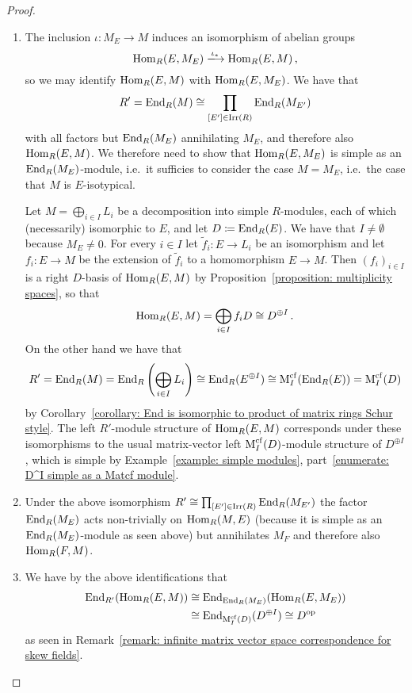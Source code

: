 \begin{proof}
  \leavevmode
  \begin{enumerate}
    \item
      The inclusion $\iota \colon M_E \to M$ induces an isomorphism of abelian groups
      \[
        \Hom_R(E, M_E)
        \xlongrightarrow{\iota_*}
        \Hom_R(E, M) \,,
      \]
      so we may identify $\operatorname{Hom}_R(E, M)$ with $\operatorname{Hom}_R(E, M_E)$.
      We have that
      \[
              R'
        =     \operatorname{End}_R(M)
        \cong \prod_{[E'] \in \operatorname{Irr}(R)} \operatorname{End}_R(M_{E'})
      \]
      with all factors but $\operatorname{End}_R(M_E)$ annihilating $M_E$, and therefore also $\operatorname{Hom}_R(E,M)$.
      We therefore need to show that $\operatorname{Hom}_R(E,M_E)$ is simple as an $\operatorname{End}_R(M_E)$-module, i.e.\ it sufficies to consider the case $M = M_E$, i.e.\ the case that $M$ is $E$-isotypical.
      
      Let $M = \bigoplus_{i \in I} L_i$ be a decomposition into simple $R$-modules, each of which (necessarily) isomorphic to $E$, and let $D \coloneqq \operatorname{End}_R(E)$.
      We have that $I \neq \emptyset$ because $M_E \neq 0$.
      For every $i \in I$ let $\tilde{f}_i \colon E \to L_i$ be an isomorphism and let $f_i \colon E \to M$ be the extension of $\tilde{f}_i$ to a homomorphism $E \to M$.
      Then $(f_i)_{i \in I}$ is a right $D$-basis of $\operatorname{Hom}_R(E,M)$ by Proposition~\ref{proposition: multiplicity spaces}, so that
      \[
              \operatorname{Hom}_R(E,M)
        =     \bigoplus_{i \in I} f_i D
        \cong D^{\oplus I} \,.
      \]
      On the other hand we have that
      \[
              R'
        =     \operatorname{End}_R(M)
        =     \operatorname{End}_R\left( \bigoplus_{i \in I} L_i \right)
        \cong \operatorname{End}_R( E^{\oplus I} )
        \cong \operatorname{M}_I^{{\operatorname{cf}}}( \operatorname{End}_R(E) )
        =     \operatorname{M}_I^{{\operatorname{cf}}}( D )
      \]
      by Corollary~\ref{corollary: End is isomorphic to product of matrix rings Schur style}.
      The left $R'$-module structure of $\operatorname{Hom}_R(E,M)$ corresponds under these isomorphisms to the usual matrix-vector left $\operatorname{M}_I^{{\operatorname{cf}}}(D)$-module structure of $D^{\oplus I}$, which is simple by Example~\ref{example: simple modules}, part~\ref*{enumerate: D^I simple as a Matcf module}.
    \item
      Under the above isomorphism $R' \cong \prod_{[E'] \in \operatorname{Irr}(R)} \operatorname{End}_R(M_{E'})$ the factor $\operatorname{End}_R(M_E)$ acts non-trivially on $\operatorname{Hom}_R(M,E)$ (because it is simple as an $\operatorname{End}_R(M_E)$-module as seen above) but annihilates $M_F$ and therefore also $\operatorname{Hom}_R(F,M)$.
    \item
      We have by the above identifications that 
      \begin{align*}
                \operatorname{End}_{R'}( \operatorname{Hom}_R(E,M) )
        &\cong  \operatorname{End}_{\operatorname{End}_R(M_E)}( \operatorname{Hom}_{R}(E,M_E) )   \\
        &\cong  \operatorname{End}_{\operatorname{M}_I^{{\operatorname{cf}}}(D)}( D^{\oplus I} )
         \cong  D^{\operatorname{op}}
      \end{align*}
      as seen in Remark~\ref{remark: infinite matrix vector space correspondence for skew fields}.
    \qedhere
  \end{enumerate}
\end{proof}



